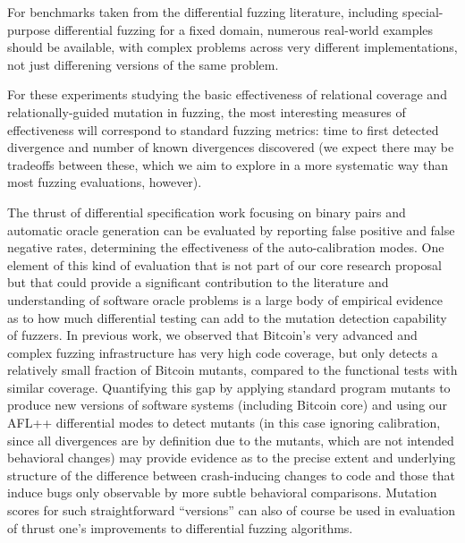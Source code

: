 For benchmarks taken from the
differential fuzzing literature, including special-purpose
differential fuzzing for a fixed domain, numerous real-world examples
should be available, with complex problems across very different
implementations, not just differening versions of the same problem.

For these experiments studying the basic effectiveness of relational
coverage and relationally-guided mutation in fuzzing, the most
interesting measures of effectiveness will correspond to standard fuzzing metrics:
time to first detected divergence and number of known divergences
discovered (we expect there may be tradeoffs between these, which we
aim to explore in a more systematic way than most fuzzing evaluations,
however).

The thrust of differential specification work focusing on binary pairs
and automatic oracle generation can be evaluated by reporting false
positive and false negative rates, determining the
effectiveness of the auto-calibration modes.  One element
of this kind of evaluation that is not part of our core research
proposal but that could provide a significant contribution to the literature and
understanding of software oracle problems is a large body of empirical
evidence as to how much differential testing can add to the mutation
detection capability of fuzzers.  In previous work, we observed that
Bitcoin's very advanced and complex fuzzing infrastructure has very
high code coverage, but only detects a relatively small fraction of
Bitcoin mutants, compared to the functional tests with similar
coverage.  Quantifying this gap by applying standard program mutants
to produce new versions of software systems (including Bitcoin core)
and using our AFL++ differential modes to detect mutants (in this case
ignoring calibration, since all divergences are by definition due to
the mutants, which are not intended behavioral changes) may provide
evidence as to the precise extent and underlying structure of the
difference between crash-inducing changes to code and those that
induce bugs only observable by more subtle behavioral comparisons.
Mutation scores for such straightforward ``versions'' can also of
course be used in evaluation of thrust one's improvements to
differential fuzzing algorithms.

